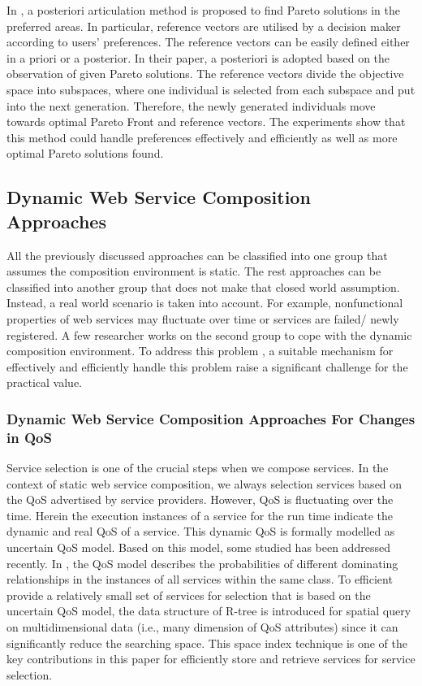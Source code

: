 In \cite{cheng2015reference}, a posteriori articulation method is proposed to find Pareto solutions in the preferred areas. In particular, reference vectors are utilised by a decision maker according to users' preferences. The reference vectors can be easily defined either in a priori or a posterior. In their paper, a posteriori is adopted based on the observation of given Pareto solutions. The reference vectors divide the objective space into subspaces, where one individual is selected from each subspace and put into the next generation. Therefore, the newly generated individuals move towards optimal Pareto Front and reference vectors. The experiments show that this method could handle preferences effectively and efficiently as well as more optimal Pareto solutions found.



\subsection{Dynamic Web Service Composition Approaches}\label{dynamicserivce}
All the previously discussed approaches can be classified into one group that assumes the composition environment is static. The rest approaches can be classified into another group that does not make that closed world assumption. Instead, a real world scenario is taken into account. For example, nonfunctional properties of web services may fluctuate over time or services are failed/ newly registered. A few researcher works on the second group to cope with the dynamic composition environment. To address this problem \cite{nasridinov2012qos},  a suitable mechanism for effectively and efficiently handle this problem raise a significant challenge for the practical value.

\subsubsection{Dynamic Web Service Composition Approaches For Changes in QoS}\label{dynamicQoS}

Service selection is one of the crucial steps when we compose services. In the context of static web service composition, we always selection services based on the QoS advertised by service providers. However, QoS is fluctuating over the time. Herein the execution instances of a service for the run time indicate the dynamic and real QoS of a service. This dynamic QoS is formally modelled as uncertain QoS model.  Based on this model, some studied \cite{wen2014probabilistic} has been addressed recently. In \cite{wen2014probabilistic}, the QoS model describes the probabilities of different dominating relationships in the instances of all services within the same class. To efficient provide a relatively small set of services for selection that is based on the uncertain QoS model, the data structure of R-tree is introduced for spatial query on multidimensional data (i.e., many dimension of QoS attributes) since it can significantly reduce the searching space. This space index technique is one of the key contributions in this paper for efficiently store and retrieve services for service selection. 

